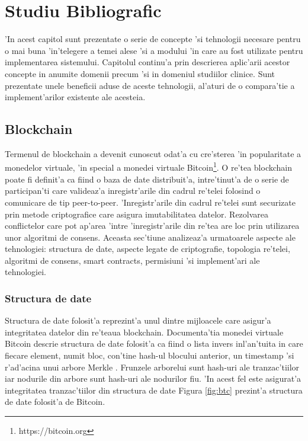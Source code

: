 \documentclass[12pt,a4paper,twoside]{report}
\begin{document}
    
    




\chapter{Studiu Bibliografic}
	'In acest capitol sunt prezentate o serie de concepte 'si tehnologii necesare pentru o mai buna 'in'telegere a temei alese 'si a modului 'in care au fost utilizate pentru implementarea sistemului. Capitolul continu'a prin descrierea aplic'arii acestor concepte in anumite domenii precum 'si in domeniul studiilor clinice. Sunt prezentate unele beneficii aduse de aceste tehnologii, al'aturi de o compara'tie a implement'arilor existente ale acesteia.
	\section{Blockchain}	
	Termenul de blockchain a devenit cunoscut odat'a cu cre'sterea 'in popularitate a monedelor virtuale, 'in special a monedei virtuale Bitcoin\footnote{https://bitcoin.org}. O re'tea blockchain poate fi definit'a ca fiind o baza de date distribuit'a, intre'tinut'a de o serie de participan'ti care valideaz'a inregistr'arile din cadrul re'telei folosind o comunicare de tip peer-to-peer. 'Inregistr'arile din cadrul re'telei sunt securizate prin metode criptografice care asigura imutabilitatea datelor. Rezolvarea conflictelor care pot ap'area 'intre 'inregistr'arile din re'tea are loc prin utilizarea unor algoritmi de consens. Aceasta sec'tiune analizeaz'a urmatoarele aspecte ale tehnologiei: structura de date, aspecte legate de criptografie, topologia re'telei, algoritmi de consens, smart contracts, permisiuni 'si implement'ari ale tehnologiei.

	\subsection{Structura de date}
	Structura de date folosit'a reprezint'a unul dintre mijloacele care asigur'a integritatea datelor din re'teaua blockchain. Documenta'tia monedei virtuale Bitcoin descrie structura de date folosit'a ca fiind o lista invers inl'an'tuita in care fiecare element, numit bloc, con'tine hash-ul blocului anterior, un timestamp 'si r'ad'acina unui arbore Merkle \cite{merkle}. Frunzele arborelui sunt hash-uri ale tranzac'tiilor iar nodurile din arbore sunt hash-uri ale nodurilor fiu. 'In acest fel este asigurat'a integritatea tranzac'tiilor din structura de date Figura \ref{fig:btc} prezint'a structura de date folosit'a de Bitcoin\cite{bitcoin}.
	
\end{document}
